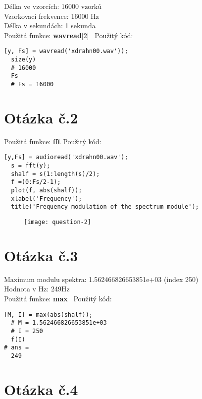 \documentclass[a4paper,11pt]{article}
\begin{document}
Délka ve vzorcích: 16000 vzorků\\
Vzorkovací frekvence: 16000 Hz\\
Délka v sekundách: 1 sekunda\\
\newline
Použitá funkce: \textbf{wavread}[2]\
\newline
\newline
Použitý kód:
\lstset{language=Octave}
\begin{lstlisting}[frame=single,breaklines]
  [y, Fs] = wavread('xdrahn00.wav'));
  size(y)
  # 16000
  Fs
  # Fs = 16000
\end{lstlisting}

\section{Otázka č.2}

Použitá funkce: \textbf{fft}
\newline
\newline
Použitý kód:
\lstset{language=Matlab}
\begin{lstlisting}[frame=single,breaklines]
  [y,Fs] = audioread('xdrahn00.wav');
  s = fft(y);
  shalf = s(1:length(s)/2);
  f =(0:Fs/2-1);
  plot(f, abs(shalf));
  xlabel('Frequency');
  title('Frequency modulation of the spectrum module');
\end{lstlisting}

\begin{figure}[h]
  \centering
  \texttt{[image: question-2]}
\end{figure}

\section{Otázka č.3}

Maximum modulu spektra: 1.562466826653851e+03 (index 250)\\
Hodnota v Hz: 249Hz\\
\newline
Použitá funkce: \textbf{max}\
\newline
\newline
Použitý kód:
\lstset{language=Matlab}
\begin{lstlisting}[frame=single,breaklines]
  [M, I] = max(abs(shalf));
  # M = 1.562466826653851e+03
  # I = 250
  f(I)
# ans =
  249
\end{lstlisting}

\section{Otázka č.4}
\end{document}

